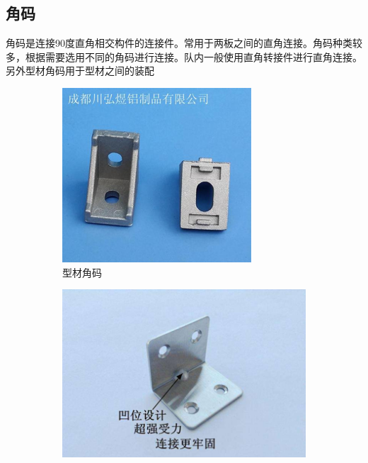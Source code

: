 \documentclass[UTF8]{article} %
\begin{document}
\subsection{角码}
角码是连接90度直角相交构件的连接件。常用于两板之间的直角连接。角码种类较多，根据需要选用不同的角码进行连接。队内一般使用直角转接件进行直角连接。另外型材角码用于型材之间的装配
\begin{figure}[H]
  \centering
  \begin{subfigure}[b]{0.3\textwidth}
         \centering
         \includegraphics[width=\textwidth]{jiao1.png}
          \caption{型材角码}
  \end{subfigure}
  \quad
  \begin{subfigure}[b]{0.4\textwidth}
          \centering
          \includegraphics[width=\textwidth]{jiao2.png}

\end{subfigure}
\end{figure}
\end{document}
